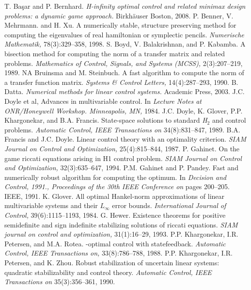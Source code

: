 \documentclass[12pt,a4paper]{article}
\theoremstyle{definition}
\newcommand{\hinf}{\text{\emph{H$_\infty$ }}}
\begin{document}
\newpage
\begin{thebibliography}{99}
 T. Başar and P. Bernhard. \textit{H-infinity optimal control and related minimax design problems: a dynamic game approach.} Birkhäuser Boston, 2008.
 P. Benner, V. Mehrmann. and H. Xu. A numerically stable, structure preserving method for computing the eigenvalues of real hamiltonian or symplectic pencils. \textit{Numerische Mathematik,} 78(3):329–358, 1998.
 S. Boyd, V. Balakrishnan, and P. Kabamba. A bisection method for computing the \hinf norm of a transfer matrix and related problems. \textit{Mathematics of Control, Signals, and Systems (MCSS),} 2(3):207–219, 1989.
 NA Bruinsma and M. Steinbuch. A fast algorithm to compute the \hinf norm of a transfer function matrix. \textit{Systems \& Control Letters,} 14(4):287–293, 1990.
 B. Datta. \textit{Numerical methods for linear control systems.} Academic Press, 2003.
 J.C. Doyle et al, Advances in multivariable control. In \textit{Lecture Notes at ONR/Honeywell Workshop. Minneapolis, MN,} 1984.
 J.C. Doyle, K. Glover, P.P. Khargonekar, and B.A. Francis. State-space solutions to standard \emph{H$_2$} and \hinf control problems. \textit{Automatic Control, IEEE Transactions on} 34(8):831–847, 1989.
 B.A. Francis and J.C. Doyle. Linear control theory with an \hinf optimality criterion. \textit{SIAM Journal on Control and Optimization, } 25(4):815–844, 1987.
 P. Gahinet. On the game riccati equations arising in H1 control problem. \textit{SIAM Journal on Control and Optimization,} 32(3):635–647, 1994.
 P.M. Gahinet and P. Pandey. Fast and numerically robust algorithm for computing the \hinf optimum. In \textit{Decision and Control, 1991., Proceedings of the 30th IEEE Conference on } pages 200–205. IEEE, 1991.
 K. Glover. All optimal Hankel-norm approximations of linear multivariable systems and their \emph{$L_\infty$} error bounds. \textit{International Journal of Control,} 39(6):1115–1193, 1984.
 G. Hewer. Existence theorems for positive semidefinite and sign indefinite stabilizing solutions of \hinf riccati equations. \textit{SIAM journal on control and optimization,} 31(1):16–29, 1993.
 P.P. Khargonekar, I.R. Petersen, and M.A. Rotea. \hinf-optimal control with statefeedback. \textit{Automatic Control, IEEE Transactions on, } 33(8):786–788, 1988.
 P.P. Khargonekar, I.R. Petersen, and K. Zhou. Robust stabilization of uncertain linear systems: quadratic stabilizability and \hinf control theory. \textit{Automatic Control, IEEE Transactions on } 35(3):356–361, 1990.

\end{thebibliography}
\end{document}
